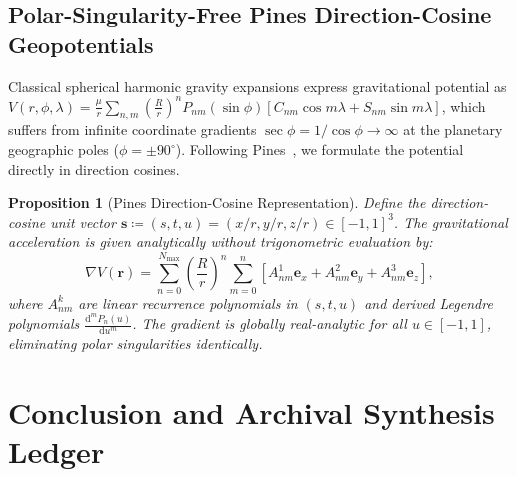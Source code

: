\documentclass[11pt,a4paper,reqno]{article}
\theoremstyle{plain}
\newtheorem{proposition}[theorem]{Proposition}
\theoremstyle{definition}
\theoremstyle{remark}
\numberwithin{equation}{section}
\begin{document}
\subsection{Polar-Singularity-Free Pines Direction-Cosine Geopotentials}
Classical spherical harmonic gravity expansions express gravitational potential as $V(r, \phi, \lambda) = \frac{\mu}{r}\sum_{n,m} (\frac{R}{r})^n P_{nm}(\sin\phi)[C_{nm}\cos m\lambda + S_{nm}\sin m\lambda]$, which suffers from infinite coordinate gradients $\sec\phi = 1/\cos\phi \to \infty$ at the planetary geographic poles ($\phi = \pm 90^\circ$). Following Pines~\cite{pines1973}, we formulate the potential directly in direction cosines.

\begin{proposition}[Pines Direction-Cosine Representation]
Define the direction-cosine unit vector $\mathbf{s} \coloneqq (s, t, u) = (x/r, y/r, z/r) \in [-1, 1]^3$. The gravitational acceleration is given analytically without trigonometric evaluation by:
\begin{equation}
  \nabla V(\mathbf{r}) = \sum_{n=0}^{N_{\max}} \left( \frac{R}{r} \right)^n \sum_{m=0}^n \left[ A_{nm}^1 \mathbf{e}_x + A_{nm}^2 \mathbf{e}_y + A_{nm}^3 \mathbf{e}_z \right],
\end{equation}
where $A_{nm}^k$ are linear recurrence polynomials in $(s, t, u)$ and derived Legendre polynomials $\frac{\mathrm{d}^m P_n(u)}{\mathrm{d}u^m}$. The gradient is globally real-analytic for all $u \in [-1, 1]$, eliminating polar singularities identically.
\end{proposition}

\section{Conclusion and Archival Synthesis Ledger}
\label{sec:conclusion}
\end{document}
